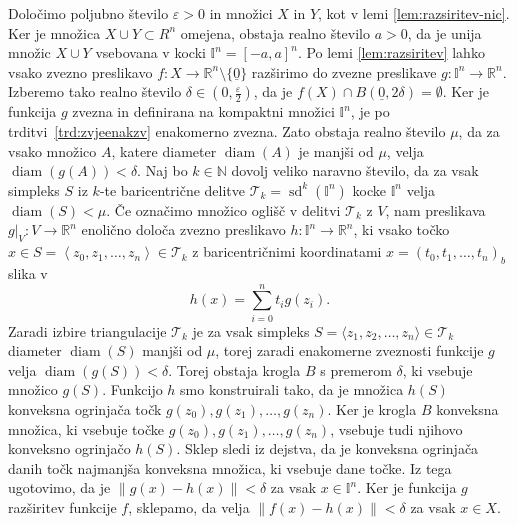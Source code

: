 \documentclass[mat1]{fmfdelo}
\newcommand{\R}{\mathbb R}
\newcommand{\N}{\mathbb N}
\DeclareMathOperator{\diam}{diam}
\DeclareMathOperator{\sd}{sd}
\newcommand{\I}{\mathbb I}
\newcommand{\0}{\underline{0}}
\newcommand{\pT}{\mathcal T}
\begin{document}
\begin{dokaz}
Določimo poljubno število $\varepsilon > 0$ in množici $X$ in $Y$, kot v lemi \ref{lem:razsiritev-nic}. Ker je množica $X \cup Y \subset R^n$ omejena, obstaja realno število $a > 0$, da je unija množic $X \cup Y$ vsebovana v kocki $\I^n = \left [ -a, a \right ]^n$. Po lemi \ref{lem:razsiritev} lahko vsako zvezno preslikavo $f : X \to \R^n \setminus \{ \0 \}$ razširimo do zvezne preslikave $g : \I^n \to \R^n$. Izberemo tako realno število $\delta \in (0, \frac{\varepsilon}{2})$, da je $f(X) \cap B( \0, 2\delta) = \emptyset$. Ker je funkcija $g$ zvezna in definirana na kompaktni množici $\I^n$, je po trditvi~\ref{trd:zvjeenakzv} enakomerno zvezna. Zato obstaja realno število $\mu$, da za vsako množico $A$, katere diameter $\diam(A)$ je manjši od $\mu$, velja $\diam(g(A)) < \delta$. Naj bo $k \in \N$ dovolj veliko naravno število, da za vsak simpleks $S$ iz $k$-te baricentrične delitve $\pT_k = \sd^k(\I^n)$ kocke $\I^n$ velja $\diam(S) < \mu$. Če označimo množico oglišč v delitvi $\pT_k$ z $V$, nam preslikava $g|_V : V \to \R^n$ enolično določa zvezno preslikavo $h : \I^n \to \R^n$, ki vsako točko $x \in S = \left < z_0, z_1, \dots, z_n \right > \in \pT_k$ z baricentričnimi koordinatami $x = (t_0, t_1, \dots, t_n)_b$ slika v 
$$h(x) = \sum_{i=0}^n t_i g(z_i).$$
Zaradi izbire triangulacije $\pT_k$ je za vsak simpleks $S = \langle  z_1, z_2, \dots, z_n \rangle \in \pT_k$ diameter $\diam(S)$ manjši od $\mu$, torej zaradi enakomerne zveznosti funkcije $g$ velja $\diam (g(S)) < \delta$. Torej obstaja krogla $B$ s premerom $\delta$, ki vsebuje množico $g(S)$. Funkcijo $h$ smo konstruirali tako, da je množica $h(S)$ konveksna ogrinjača točk $g(z_0), g(z_1), \dots, g(z_n)$. Ker je krogla $B$ konveksna množica, ki vsebuje točke $g(z_0), g(z_1), \dots, g(z_n)$, vsebuje tudi njihovo konveksno ogrinjačo $h(S)$. Sklep sledi iz dejstva, da je konveksna ogrinjača danih točk najmanjša konveksna množica, ki vsebuje dane točke. Iz tega ugotovimo, da je $\| g(x) - h(x) \| < \delta$ za vsak $x \in \I^n$. Ker je funkcija $g$ razširitev funkcije $f$, sklepamo, da velja $\| f(x) - h(x) \| < \delta$ za vsak $x \in X$.


\end{dokaz}
\end{document}
